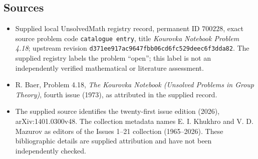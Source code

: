 \documentclass[11pt]{article}
\begin{document}
\subsection{Sources}
\begin{itemize}
\item Supplied local UnsolvedMath registry record, permanent ID \(700228\), exact source problem code \texttt{catalogue entry}, title \emph{Kourovka Notebook Problem 4.18}; upstream revision \texttt{d371ee917ac9647fbb06cd6fc529deec6f3dda82}. The supplied registry labels the problem ``open''; this label is not an independently verified mathematical or literature assessment.
\item R. Baer, Problem 4.18, \emph{The Kourovka Notebook (Unsolved Problems in Group Theory)}, fourth issue (1973), as attributed in the supplied record.
\item The supplied source identifies the twenty-first issue edition (2026), arXiv:1401.0300v48. The collection metadata names E. I. Khukhro and V. D. Mazurov as editors of the Issues 1--21 collection (1965--2026). These bibliographic details are supplied attribution and have not been independently checked.
\end{itemize}
\end{document}
